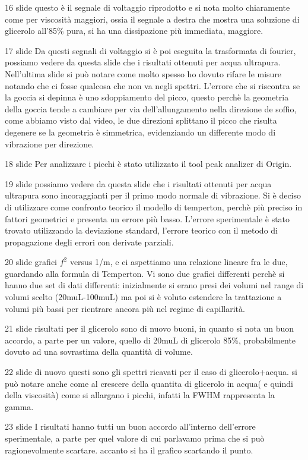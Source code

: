 16 slide
questo è il segnale di voltaggio riprodotto e si nota molto chiaramente come per viscosità maggiori, ossia il segnale a destra che mostra una soluzione di glicerolo all'85\% pura, si ha una dissipazione più immediata, maggiore.

17 slide
Da questi segnali di voltaggio si è poi eseguita la trasformata di fourier, possiamo vedere da questa slide che i risultati ottenuti per acqua ultrapura.
Nell'ultima slide si può notare come molto spesso ho dovuto rifare le misure notando che ci fosse qualcosa che non va negli spettri. L'errore che si riscontra se la goccia si depinna è uno sdoppiamento del picco, questo perchè la geometria della goccia tende a cambiare per via dell'allungamento nella direzione de soffio, come abbiamo visto dal video, le due direzioni splittano il picco che risulta degenere se la geometria è simmetrica, evidenziando un differente modo di vibrazione per direzione.

18 slide
Per analizzare i picchi è stato utilizzato il tool peak analizer di Origin.

19 slide
possiamo vedere da questa slide che i risultati ottenuti per acqua ultrapura sono incoraggianti per il primo modo normale di vibrazione. Si è deciso di utilizzare come confronto teorico il modello di temperton, perchè più preciso in fattori geometrici e presenta un errore più basso. L'errore sperimentale è stato trovato utilizzando la deviazione standard, l'errore teorico con il metodo di propagazione degli errori con derivate parziali.

20 slide
grafici $f^2$ versus 1/m, e ci aspettiamo una relazione lineare fra le due, guardando alla formula di Temperton. Vi sono due grafici differenti perchè si hanno due set di dati differenti: inizialmente si erano presi dei volumi nel range di volumi scelto (20muL-100muL) ma poi si è voluto estendere la trattazione a volumi più bassi per rientrare ancora più nel regime di capillarità.

21 slide
risultati per il glicerolo sono di nuovo buoni, in quanto si nota un buon accordo, a parte per un valore, quello di 20muL di glicerolo 85\%, probabilmente dovuto ad una sovrastima della quantità di volume.
 
22 slide
di nuovo questi sono gli spettri ricavati per il caso di glicerolo+acqua. si può notare anche come al crescere della quantita di glicerolo in acqua( e quindi della viscosità) come si allargano i picchi, infatti la FWHM rappresenta la gamma.

23 slide
I risultati hanno tutti un buon accordo all'interno dell'errore sperimentale, a parte per quel valore di cui parlavamo prima che si può ragionevolmente scartare. accanto si ha il grafico scartando il punto.

